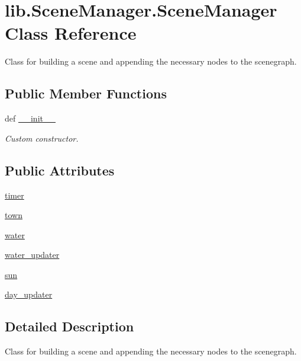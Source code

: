 \hypertarget{classlib_1_1SceneManager_1_1SceneManager}{\section{lib.\-Scene\-Manager.\-Scene\-Manager \-Class \-Reference}
\label{classlib_1_1SceneManager_1_1SceneManager}
}


\-Class for building a scene and appending the necessary nodes to the scenegraph.  


\subsection*{\-Public \-Member \-Functions}
\begin{DoxyCompactItemize}
\item 
def \hyperlink{classlib_1_1SceneManager_1_1SceneManager_a479b19d02a8aa95d1820ef45ec30b33f}{\-\_\-\-\_\-init\-\_\-\-\_\-}
\begin{DoxyCompactList}\small\item\em \-Custom constructor. \end{DoxyCompactList}\end{DoxyCompactItemize}
\subsection*{\-Public \-Attributes}
\begin{DoxyCompactItemize}
\item 
\hyperlink{classlib_1_1SceneManager_1_1SceneManager_a2a76ef71168bcd14ed6d52ad312a6c4b}{timer}
\item 
\hyperlink{classlib_1_1SceneManager_1_1SceneManager_aebd3f5941c66021fa1828fcee7a099b4}{town}
\item 
\hyperlink{classlib_1_1SceneManager_1_1SceneManager_a1b107462d7b9f6ee2ec9137864c693b0}{water}
\item 
\hyperlink{classlib_1_1SceneManager_1_1SceneManager_ada5c9a73c4fa19191e50f8048f5754ff}{water\-\_\-updater}
\item 
\hyperlink{classlib_1_1SceneManager_1_1SceneManager_a2df354563b636fe549c4a9561828eeda}{sun}
\item 
\hyperlink{classlib_1_1SceneManager_1_1SceneManager_ab64da1c455ab464a017871db0087cf53}{day\-\_\-updater}
\end{DoxyCompactItemize}


\subsection{\-Detailed \-Description}
\-Class for building a scene and appending the necessary nodes to the scenegraph. 

